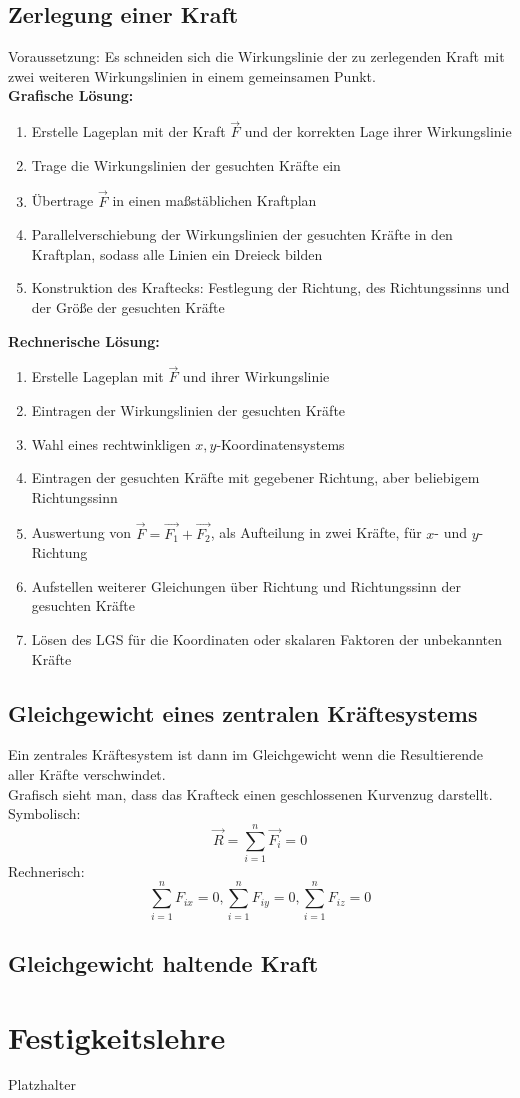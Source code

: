\documentclass[a4paper,parskip=half*,DIV=7,fontsize=11pt]{scrartcl}
\begin{document}
\subsection{Zerlegung einer Kraft}
Voraussetzung: Es schneiden sich die Wirkungslinie der zu zerlegenden Kraft mit zwei weiteren Wirkungslinien in einem gemeinsamen Punkt.\\
\textbf{Grafische Lösung:}
\begin{enumerate}
	\item Erstelle Lageplan mit der Kraft $\overrightarrow{F}$ und der korrekten Lage ihrer Wirkungslinie
	\item Trage die Wirkungslinien der gesuchten Kräfte ein
	\item Übertrage $\overrightarrow{F}$ in einen maßstäblichen Kraftplan
	\item Parallelverschiebung der Wirkungslinien der gesuchten Kräfte in den Kraftplan, sodass alle Linien ein Dreieck bilden
	\item Konstruktion des Kraftecks: Festlegung der Richtung, des Richtungssinns und der Größe der gesuchten Kräfte
\end{enumerate}
\textbf{Rechnerische Lösung:}
\begin{enumerate}
	\item Erstelle Lageplan mit $\overrightarrow{F}$ und ihrer Wirkungslinie
	\item Eintragen der Wirkungslinien der gesuchten Kräfte
	\item Wahl eines rechtwinkligen $x,y$-Koordinatensystems
	\item Eintragen der gesuchten Kräfte mit gegebener Richtung, aber beliebigem Richtungssinn
	\item Auswertung von $\overrightarrow{F}=\overrightarrow{F_1}+\overrightarrow{F_2}$, als Aufteilung in zwei Kräfte, für $x$- und $y$-Richtung
	\item Aufstellen weiterer Gleichungen über Richtung und Richtungssinn der gesuchten Kräfte
	\item Lösen des LGS für die Koordinaten oder skalaren Faktoren der unbekannten Kräfte
\end{enumerate}

\subsection{Gleichgewicht eines zentralen Kräftesystems}
Ein zentrales Kräftesystem ist dann im Gleichgewicht wenn die Resultierende aller Kräfte verschwindet.\\
Grafisch sieht man, dass das Krafteck einen geschlossenen Kurvenzug darstellt.\\
Symbolisch: $$\overrightarrow{R}=\sum_{i=1}^n \overrightarrow{F_i}=0$$
Rechnerisch: $$\sum_{i=1}^n F_{ix}=0,\sum_{i=1}^n F_{iy}=0,\sum_{i=1}^n F_{iz}=0$$

\subsection{Gleichgewicht haltende Kraft}



\pagebreak

\section{Festigkeitslehre}
Platzhalter
\end{document}
